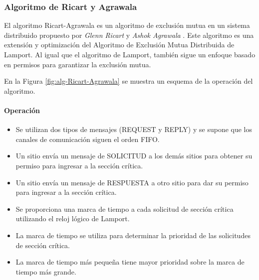 {%
\subsubsection{	Algoritmo de Ricart y Agrawala}


 
 El algoritmo Ricart-Agrawala es un algoritmo 	de exclusión mutua en un sistema distribuido propuesto 	por \textit{Glenn Ricart} y  \textit{Ashok Agrawala} \cite{Ricart1981} . 
 Este algoritmo es una extensión y optimización del Algoritmo de Exclusión 	Mutua Distribuida de Lamport. 
Al igual que el algoritmo de Lamport, también sigue un enfoque basado en permisos para garantizar la exclusión mutua.

En la Figura \ref{fig:alg-Ricart-Agrawala} se muestra un esquema de la operaci\'on del algoritmo.
	 
 
\paragraph{Operaci\'on}
	\begin{itemize} 
		\item  Se utilizan dos tipos de mensajes (REQUEST y REPLY) y se supone que los canales de comunicación siguen el
		orden FIFO. 
		\item Un sitio envía un mensaje de SOLICITUD a los
		demás sitios para obtener su permiso para ingresar a la
		sección crítica.
		\item Un sitio envía un mensaje de RESPUESTA a otro sitio para 	dar su permiso para ingresar a la sección crítica.
		\item Se proporciona una marca de tiempo a cada solicitud de 	sección crítica utilizando el reloj lógico de Lamport.
		\item La marca de tiempo se utiliza para determinar la prioridad 	de las solicitudes de sección crítica. 
		\item La marca de tiempo más pequeña tiene mayor prioridad sobre la marca de  tiempo más grande. 
	\end{itemize}
 
}

